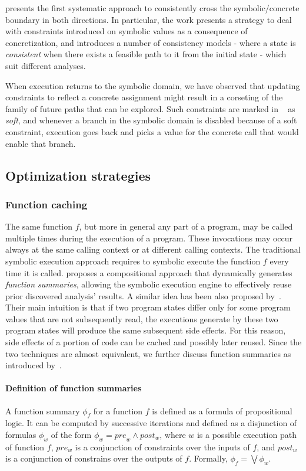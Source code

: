 \cite{CKC-TOCS12} presents the first systematic approach to consistently cross the symbolic/concrete boundary in both directions. In particular, the work presents a strategy to deal with constraints introduced on symbolic values as a consequence of concretization, and introduces a number of consistency models - where a state is {\em consistent} when there exists a feasible path to it from the initial state - which suit different analyses.

When execution returns to the symbolic domain, we have observed that updating constraints to reflect a concrete assignment might result in a corseting of the family of future paths that can be explored. Such constraints are marked in ~\cite{CKC-TOCS12} as {\em soft}, and whenever a branch in the symbolic domain is disabled because of a soft constraint, execution goes back and picks a value for the concrete call that would enable that branch.

\subsection{Optimization strategies} 
\label{function-summaries}

\subsubsection{Function caching} The same function $f$, but more in general any part of a program, may be called multiple times during the execution of a program. These invocations may occur always at the same calling context or at different calling contexts. The traditional symbolic execution approach requires to symbolic execute the function $f$ every time it is called. \cite{G-POPL07} proposes a compositional approach that dynamically generates {\em function summaries}, allowing the symbolic execution engine to effectively reuse prior discovered analysis' results. A similar idea has been also proposed by~\cite{BCE-TACAS08}. Their main intuition is that if two program states differ only for some program values that are not subsequently read, the executions generate by these two program states will produce the same subsequent side effects. For this reason, side effects of a portion of code can be cached and possibly later reused. Since the two techniques are almost equivalent, we further discuss function summaries as introduced by~\cite{G-POPL07}.

\paragraph{Definition of function summaries} A function summary $\phi_f$ for a function $f$ is defined as a formula of propositional logic. It can be computed by successive iterations and defined as a disjunction of formulas $\phi_w$ of the form $\phi_w = {pre}_w \wedge post_w$, where $w$ is a possible execution path of function $f$, $pre_w$ is a conjunction of constraints over the inputs of $f$, and $post_w$ is a conjunction of constrains over the outputs of $f$. Formally, $\phi_f = \bigvee \phi_w$.  

